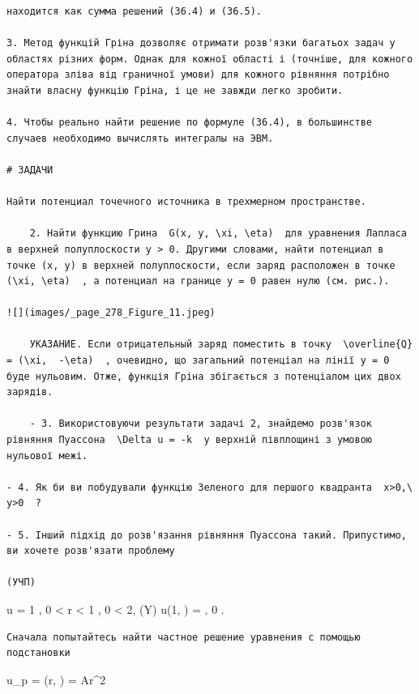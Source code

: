 \documentclass[
  ukrainian,
]{article}
\begin{document}
\begin{verbatim}
находится как сумма решений (36.4) и (36.5).

3. Метод функцій Гріна дозволяє отримати розв'язки багатьох задач у областях різних форм. Однак для кожної області і (точніше, для кожного оператора зліва від граничної умови) для кожного рівняння потрібно знайти власну функцію Гріна, і це не завжди легко зробити.

4. Чтобы реально найти решение по формуле (36.4), в большинстве случаев необходимо вычислять интегралы на ЭВМ.

# ЗАДАЧИ

Найти потенциал точечного источника в трехмерном пространстве.

    2. Найти функцию Грина  G(x, y, \xi, \eta)  для уравнения Лапласа в верхней полуплоскости y > 0. Другими словами, найти потенциал в точке (x, y) в верхней полуплоскости, если заряд расположен в точке  (\xi, \eta)  , а потенциал на границе y = 0 равен нулю (см. рис.).

![](images/_page_278_Figure_11.jpeg)

    УКАЗАНИЕ. Если отрицательный заряд поместить в точку  \overline{Q} = (\xi,  -\eta)  , очевидно, що загальний потенціал на лінії y = 0 буде нульовим. Отже, функція Гріна збігається з потенціалом цих двох зарядів.

    - 3. Використовуючи результати задачі 2, знайдемо розв'язок рівняння Пуассона  \Delta u = -k  у верхній півплощині з умовою нульової межі.

- 4. Як би ви побудували функцію Зеленого для першого квадранта  x>0,\ y>0  ?

- 5. Інший підхід до розв'язання рівняння Пуассона такий. Припустимо, ви хочете розв'язати проблему

(УЧП)
\end{verbatim}

\Delta u = 1 , 0 \textless{} r \textless{} 1 , 0 \le \theta \textless{}
2\pi  , (\Gamma Y) u(1, \theta) = \sin \theta  , 0
\le \theta {}\pi  .

\begin{verbatim}
Сначала попытайтесь найти частное решение уравнения с помощью подстановки
\end{verbatim}

u\_p = (r, \theta) = Ar\^{}2
\end{document}
